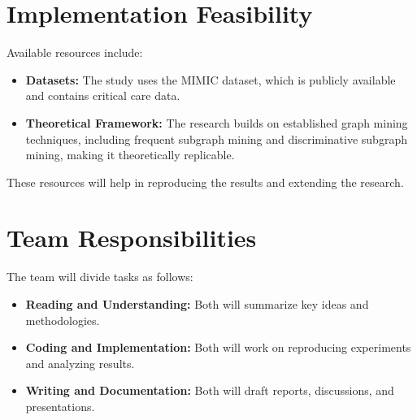 \documentclass[12pt]{article}
\begin{document}
\section{Implementation Feasibility}
Available resources include:
\begin{itemize}
    \item \textbf{Datasets:} The study uses the MIMIC dataset, which is publicly available and contains critical care data.
    \item \textbf{Theoretical Framework:} The research builds on established graph mining techniques, including frequent subgraph mining and discriminative subgraph mining, making it theoretically replicable.
\end{itemize}
These resources will help in reproducing the results and extending the research.

\section{Team Responsibilities}
The team will divide tasks as follows:
\begin{itemize}
    \item \textbf{Reading and Understanding:} Both will summarize key ideas and methodologies.
    \item \textbf{Coding and Implementation:} Both will work on reproducing experiments and analyzing results.
    \item \textbf{Writing and Documentation:} Both will draft reports, discussions, and presentations.
\end{itemize}
\end{document}
